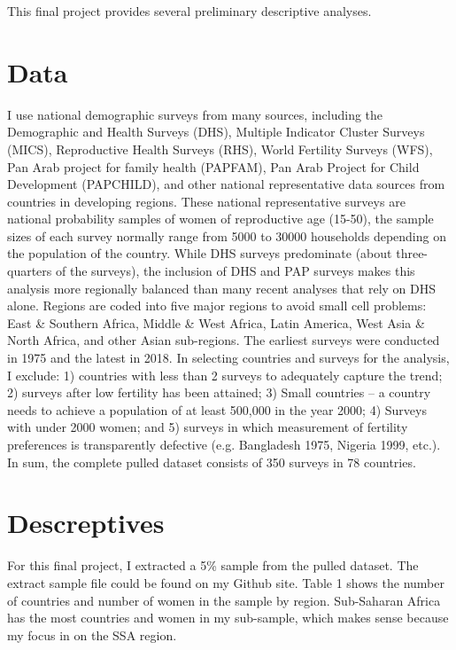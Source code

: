 \documentclass[12pt]{article}
\begin{document}
This final project provides several preliminary descriptive analyses.

\section{Data}
I use national demographic surveys from many sources, including the Demographic and Health Surveys (DHS), Multiple Indicator Cluster Surveys (MICS), Reproductive Health Surveys (RHS), World Fertility Surveys (WFS), Pan Arab project for family health (PAPFAM), Pan Arab Project for Child Development (PAPCHILD), and other national representative data sources from countries in developing regions. These national representative surveys are national probability samples of women of reproductive age (15-50), the sample sizes of each survey normally range from 5000 to 30000 households depending on the population of the country. While DHS surveys predominate (about three-quarters of the surveys), the inclusion of DHS and PAP surveys makes this analysis more regionally balanced than many recent analyses that rely on DHS alone. Regions are coded into five major regions to avoid small cell problems: East \& Southern Africa, Middle \& West Africa, Latin America, West Asia \& North Africa, and other Asian sub-regions. The earliest surveys were conducted in 1975 and the latest in 2018.
In selecting countries and surveys for the analysis, I exclude: 1) countries with less than 2 surveys to adequately capture the trend; 2) surveys after low fertility has been attained; 3) Small countries -- a country needs to achieve a population of at least 500,000 in the year 2000; 4) Surveys with under 2000 women; and 5) surveys in which measurement of fertility preferences is transparently defective (e.g. Bangladesh 1975, Nigeria 1999, etc.). In sum, the complete pulled dataset consists of 350 surveys in 78 countries. 

\section{Descreptives}

For this final project, I extracted a 5\% sample from the pulled dataset. The extract sample file could be found on my Github site. Table 1 shows the number of countries and number of women in the sample by region. Sub-Saharan Africa has the most countries and women in my sub-sample, which makes sense because my focus in on the SSA region.
\end{document}
